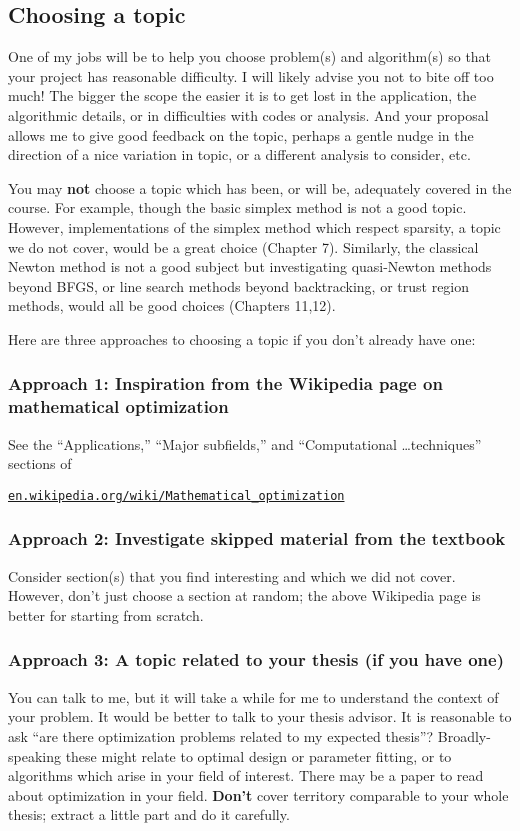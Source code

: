 \documentclass[12pt]{amsart}
\begin{document}
\subsection*{Choosing a topic}  One of my jobs will be to help you choose problem(s) and algorithm(s) so that your project has reasonable difficulty.  I will likely advise you not to bite off too much!  The bigger the scope the easier it is to get lost in the application, the algorithmic details, or in difficulties with codes or analysis.  And your proposal allows me to give good feedback on the topic, perhaps a gentle nudge in the direction of a nice variation in topic, or a different analysis to consider, etc.

You may \textbf{not} choose a topic which has been, or will be, adequately covered in the course.  For example, though the basic simplex method is not a good topic.  However, implementations of the simplex method which respect sparsity, a topic we do not cover, would be a great choice (Chapter 7).  Similarly, the classical Newton method is not a good subject but investigating quasi-Newton methods beyond BFGS, or line search methods beyond backtracking, or trust region methods, would all be good choices (Chapters 11,12).

Here are three approaches to choosing a topic if you don't already have one:

\subsubsection*{Approach 1: Inspiration from the Wikipedia page on mathematical optimization}  See the ``Applications,'' ``Major subfields,'' and ``Computational \dots techniques'' sections of

   \centerline{\href{https://en.wikipedia.org/wiki/Mathematical_optimization}{\texttt{en.wikipedia.org/wiki/Mathematical\_optimization}}}

\subsubsection*{Approach 2: Investigate skipped material from the textbook}  Consider section(s) that you find interesting and which we did not cover.  However, don't just choose a section at random; the above Wikipedia page is better for starting from scratch.

\subsubsection*{Approach 3: A topic related to your thesis (if you have one)}  You can talk to me, but it will take a while for me to understand the context of your problem.  It would be better to talk to your thesis advisor.  It is reasonable to ask ``are there optimization problems related to my expected thesis''?  Broadly-speaking these might relate to optimal design or parameter fitting, or to algorithms which arise in your field of interest.  There may be a paper to read about optimization in your field.  \textbf{Don't} cover territory comparable to your whole thesis; extract a little part and do it carefully.
\end{document}
